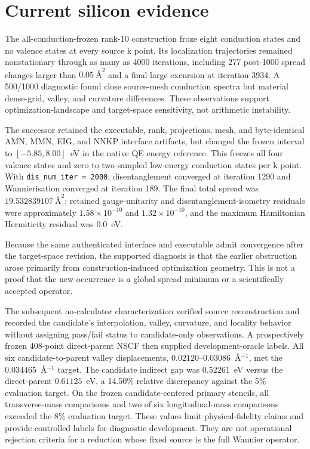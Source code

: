 \documentclass[11pt]{report}
\begin{document}
\chapter{Current silicon evidence}

The all-conduction-frozen rank-10 construction froze eight conduction states and no
valence states at every source k point.  Its localization trajectories remained
nonstationary through as many as 4000 iterations, including 277 post-1000 spread changes
larger than $0.05\ \text{\AA}^{2}$ and a final large excursion at iteration 3934.  A
500/1000 diagnostic found close source-mesh conduction spectra but material dense-grid,
valley, and curvature differences.  These observations support optimization-landscape
and target-space sensitivity, not arithmetic instability.

The successor retained the executable, rank, projections, mesh, and byte-identical
AMN, MMN, EIG, and NNKP interface artifacts, but changed the frozen interval to
$[-5.85,8.00]$~eV in the native QE energy reference.  This freezes all four valence
states and zero to two sampled low-energy conduction states per k point.  With
\texttt{dis\_num\_iter = 2000}, disentanglement converged at iteration 1290 and
Wannierisation converged at iteration 189.  The final total spread was
$19.532839107\ \text{\AA}^{2}$; retained gauge-unitarity and disentanglement-isometry
residuals were approximately $1.58\times10^{-10}$ and $1.32\times10^{-10}$, and the
maximum Hamiltonian Hermiticity residual was $0.0$~eV.

Because the same authenticated interface and executable admit convergence after the
target-space revision, the supported diagnosis is that the earlier obstruction arose
primarily from construction-induced optimization geometry.  This is not a proof that
the new occurrence is a global spread minimum or a scientifically accepted operator.

The subsequent no-calculator characterization verified source reconstruction and
recorded the candidate's interpolation, valley, curvature, and locality behavior without
assigning pass/fail status to candidate-only observations.  A prospectively frozen
408-point direct-parent NSCF then supplied development-oracle labels.  All six
candidate-to-parent valley displacements, $0.02120$--$0.03086$~\AA$^{-1}$, met the
$0.034465$~\AA$^{-1}$ target.  The candidate indirect gap was $0.52261$~eV versus the
direct-parent $0.61125$~eV, a 14.50\% relative discrepancy against the 5\% evaluation
target.  On the frozen candidate-centered primary stencils, all transverse-mass
comparisons and two of six longitudinal-mass comparisons exceeded the 8\% evaluation
target.  These values limit physical-fidelity claims and provide controlled labels for
diagnostic development.  They are not operational rejection criteria for a reduction
whose fixed source is the full Wannier operator.
\end{document}
